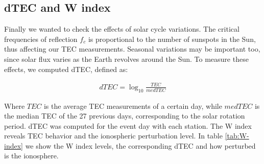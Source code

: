 


\subsection{dTEC and W index}

Finally we wanted to check the effects of solar cycle variations. The critical frequencies of reflection $f_c$ is proportional to the number of sunspots in the Sun, thus affecting our TEC measurements. Seasonal variations may be important too, since solar flux varies as the Earth revolves around the Sun. To measure these effects, we computed dTEC, defined as:

\begin{align}
    dTEC = \log_{10}\frac{TEC}{medTEC}
\end{align}

Where $TEC$ is the average TEC measurements of a certain day, while $medTEC$ is the median TEC of the 27 previous days, corresponding to the solar rotation period. dTEC was computed for the event day with each station. The W index reveals TEC behavior and the ionospheric perturbation level. In table \ref{tab:W-index} we show the W index levels, the corresponding dTEC and how perturbed is the ionosphere. %

